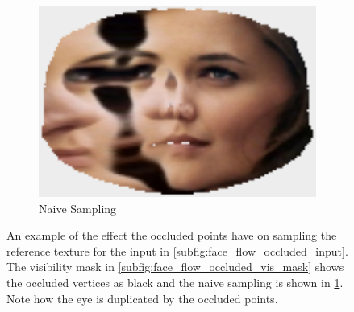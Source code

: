 \begin{figure}[t]
    \begin{subfigure}[b]{0.2\textheight}
        \centering
        \includegraphics[width=\textwidth]{face_flow/images/contour_snapping/sampled_no_snapping}
        \caption{Naive Sampling}\label{subfig:face_flow_occluded_naive}
    \end{subfigure}
    \hspace*{\fill}
    \caption{An example of the effect the occluded points have on sampling the
             reference texture for the input in
             \cref{subfig:face_flow_occluded_input}. The visibility mask in
             \cref{subfig:face_flow_occluded_vis_mask} shows the occluded
             vertices as black and the naive sampling is shown in
             \cref{subfig:face_flow_occluded_naive}. Note how the eye is
             duplicated by the occluded points.}
\label{fig:face_flow_pose_example}
\end{figure}

